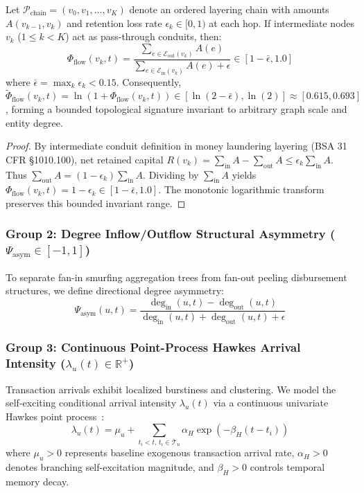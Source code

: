 \begin{lemma}
\label{lem:flow_conservation}
Let $\mathcal{P}_{\text{chain}} = (v_0, v_1, \dots, v_K)$ denote an ordered layering chain with amounts $A(v_{k-1}, v_k)$ and retention loss rate $\epsilon_k \in [0, 1)$ at each hop. If intermediate nodes $v_k$ ($1 \le k < K$) act as pass-through conduits, then:
\begin{equation}
\Phi_{\text{flow}}(v_k, t) = \frac{\sum_{e \in \mathcal{E}_{\text{out}}(v_k)} A(e)}{\sum_{e \in \mathcal{E}_{\text{in}}(v_k)} A(e) + \epsilon} \in \left[ 1 - \bar{\epsilon}, 1.0 \right]
\end{equation}
where $\bar{\epsilon} = \max_k \epsilon_k < 0.15$. Consequently, $\tilde{\Phi}_{\text{flow}}(v_k, t) = \ln(1 + \Phi_{\text{flow}}(v_k, t)) \in [\ln(2 - \bar{\epsilon}), \ln(2)] \approx [0.615, 0.693]$, forming a bounded topological signature invariant to arbitrary graph scale and entity degree.
\end{lemma}
\begin{proof}
By intermediate conduit definition in money laundering layering (BSA 31 CFR \S 1010.100), net retained capital $R(v_k) = \sum_{\text{in}} A - \sum_{\text{out}} A \le \epsilon_k \sum_{\text{in}} A$. Thus $\sum_{\text{out}} A = (1 - \epsilon_k) \sum_{\text{in}} A$. Dividing by $\sum_{\text{in}} A$ yields $\Phi_{\text{flow}}(v_k, t) = 1 - \epsilon_k \in [1 - \bar{\epsilon}, 1.0]$. The monotonic logarithmic transform preserves this bounded invariant range.
\end{proof}

\subsubsection{Group 2: Degree Inflow/Outflow Structural Asymmetry ($\Psi_{\text{asym}} \in [-1, 1]$)}
To separate fan-in smurfing aggregation trees from fan-out peeling disbursement structures, we define directional degree asymmetry:
\begin{equation}
\Psi_{\text{asym}}(u, t) = \frac{\deg_{\text{in}}(u, t) - \deg_{\text{out}}(u, t)}{\deg_{\text{in}}(u, t) + \deg_{\text{out}}(u, t) + \epsilon}
\end{equation}

\subsubsection{Group 3: Continuous Point-Process Hawkes Arrival Intensity \mbox{($\lambda_u(t) \in \mathbb{R}^+$)}}
Transaction arrivals exhibit localized burstiness and clustering. We model the self-exciting conditional arrival intensity $\lambda_u(t)$ via a continuous univariate Hawkes point process~\cite{hawkes1971spectra}:
\begin{equation}
\lambda_u(t) = \mu_u + \sum_{t_i < t, \, t_i \in \mathcal{T}_u} \alpha_H \exp\left( -\beta_H (t - t_i) \right)
\end{equation}
where $\mu_u > 0$ represents baseline exogenous transaction arrival rate, $\alpha_H > 0$ denotes branching self-excitation magnitude, and $\beta_H > 0$ controls temporal memory decay.

